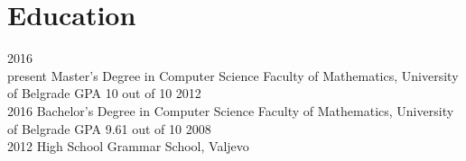\documentclass{my_cv}
\begin{document}
\section{Education}
\begin{entrylist}
  \entry
    {2016~\textemdash \\present}
    {Master's Degree in Computer Science}
    {Faculty of Mathematics, University of Belgrade}
    {GPA 10 out of 10}
  \entry
    {2012~\textemdash \\2016}
    {Bachelor's Degree in Computer Science}
    {Faculty of Mathematics, University of Belgrade}
    {GPA 9.61 out of 10}
  \entry
    {2008~\textemdash \\2012}
    {High School}
    {Grammar School, Valjevo}
    {}
\end{entrylist}
\end{document}

